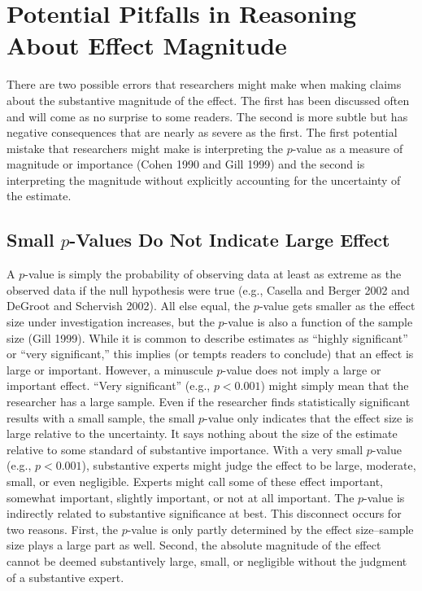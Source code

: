 \documentclass[12pt]{article}
\begin{document}
\section*{Potential Pitfalls in Reasoning About Effect Magnitude}

There are two possible errors that researchers might make when making claims about the substantive magnitude of the effect. The first has been discussed often and will come as no surprise to some readers. The second is more subtle but has negative consequences that are nearly as severe as the first. The first potential mistake that researchers might make is interpreting the $p$-value as a measure of magnitude or importance (Cohen 1990 and Gill 1999) and the second is interpreting the magnitude without explicitly accounting for the uncertainty of the estimate. 

\subsection*{Small $p$-Values Do Not Indicate Large Effect}

A $p$-value is simply the probability of observing data at least as extreme as the observed data if the null hypothesis were true (e.g., Casella and Berger 2002 and DeGroot and Schervish 2002). All else equal, the $p$-value gets smaller as the effect size under investigation increases, but the $p$-value is also a function of the sample size (Gill 1999). While it is common to describe estimates as ``highly significant'' or ``very significant,'' this implies (or tempts readers to conclude) that an effect is large or important. However, a minuscule $p$-value does not imply a large or important effect. ``Very significant'' (e.g., $p < 0.001$) might simply mean that the researcher has a large sample. Even if the researcher finds statistically significant results with a small sample, the small $p$-value only indicates that the effect size is large relative to the uncertainty. It says nothing about the size of the estimate relative to some standard of substantive importance. With a very small $p$-value (e.g., $p < 0.001$), substantive experts might judge the effect to be large, moderate, small, or even negligible. Experts might call some of these effect important, somewhat important, slightly important, or not at all important. The $p$-value is indirectly related to substantive significance at best. This disconnect occurs for two reasons. First, the $p$-value is only partly determined by the effect size--sample size plays a large part as well. Second, the absolute magnitude of the effect cannot be deemed substantively large, small, or negligible without the judgment of a substantive expert.
\end{document}
